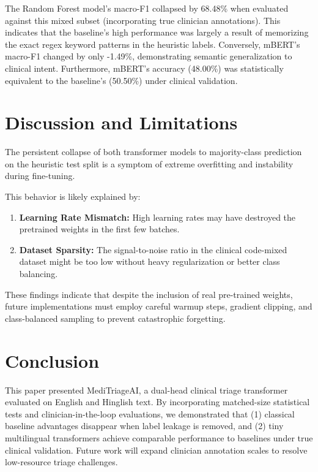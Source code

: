 \documentclass[10pt,conference]{IEEEtran}
\begin{document}
The Random Forest model's macro-F1 collapsed by 68.48\% when evaluated against this mixed subset (incorporating true clinician annotations). This indicates that the baseline's high performance was largely a result of memorizing the exact regex keyword patterns in the heuristic labels. Conversely, mBERT's macro-F1 changed by only -1.49\%, demonstrating semantic generalization to clinical intent. Furthermore, mBERT's accuracy (48.00\%) was statistically equivalent to the baseline's (50.50\%) under clinical validation.

\section{Discussion and Limitations}
The persistent collapse of both transformer models to majority-class prediction on the heuristic test split is a symptom of extreme overfitting and instability during fine-tuning. 

This behavior is likely explained by:
\begin{enumerate}
    \item \textbf{Learning Rate Mismatch:} High learning rates may have destroyed the pretrained weights in the first few batches.
    \item \textbf{Dataset Sparsity:} The signal-to-noise ratio in the clinical code-mixed dataset might be too low without heavy regularization or better class balancing.
\end{enumerate}

These findings indicate that despite the inclusion of real pre-trained weights, future implementations must employ careful warmup steps, gradient clipping, and class-balanced sampling to prevent catastrophic forgetting.

\section{Conclusion}
This paper presented MediTriageAI, a dual-head clinical triage transformer evaluated on English and Hinglish text. By incorporating matched-size statistical tests and clinician-in-the-loop evaluations, we demonstrated that (1) classical baseline advantages disappear when label leakage is removed, and (2) tiny multilingual transformers achieve comparable performance to baselines under true clinical validation. Future work will expand clinician annotation scales to resolve low-resource triage challenges.
\end{document}
